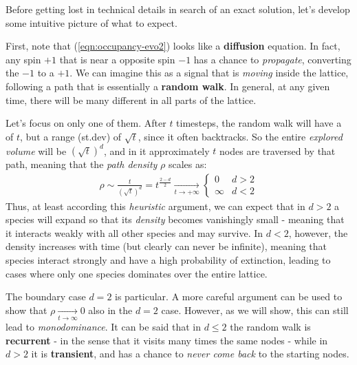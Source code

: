 \documentclass[../../main.tex]{subfiles}
\begin{document}
Before getting lost in technical details in search of an exact solution, let's develop some intuitive picture of what to expect. 

\medskip

First, note that (\ref{eqn:occupancy-evo2}) looks like a \textbf{diffusion} equation. In fact, any spin $+1$ that is near a opposite spin $-1$ has a chance to \textit{propagate}, converting the $-1$ to a $+1$. We can imagine this as a signal that is \textit{moving} inside the lattice, following a path that is essentially a \textbf{random walk}. In general, at any given time, there will be many different  in all parts of the lattice.

\medskip

Let's focus on only one of them. After $t$ timesteps, the random walk will have a  of $t$, but a range (st.dev) of $\sqrt{t}$, since it often backtracks. So the entire \textit{explored volume} will be $(\sqrt{t})^d$, and in it approximately $t$ nodes are traversed by that path, meaning that the \textit{path density} $\rho$ scales as:
\begin{align*}
    \rho \sim \frac{t}{(\sqrt{t})^d} = t^{\frac{2-d}{2}}  \xrightarrow[t \to +\infty]{} \begin{cases}
        0 & d > 2\\
        \infty & d < 2
    \end{cases}
\end{align*} 
Thus, at least according this \textit{heuristic} argument, we can expect that in $d > 2$ a species will expand so that its \textit{density} becomes vanishingly small - meaning that it interacts weakly with all other species and may survive. In $d < 2$, however, the density increases with time (but clearly can never be infinite), meaning that species interact strongly and have a high probability of extinction, leading to cases where only one species dominates over the entire lattice.

\medskip

The boundary case $d=2$ is particular. A more careful argument can be used to show that $\rho  \xrightarrow[t \to \infty]{} 0$ also in the $d=2$ case. However, as we will show, this can still lead to \textit{monodominance}. It can be said that in $d \leq 2$ the random walk is \textbf{recurrent} - in the sense that it visits many times the same nodes - while in $d > 2$ it is \textbf{transient}, and has a chance to \textit{never come back} to the starting nodes.   
\end{document}
